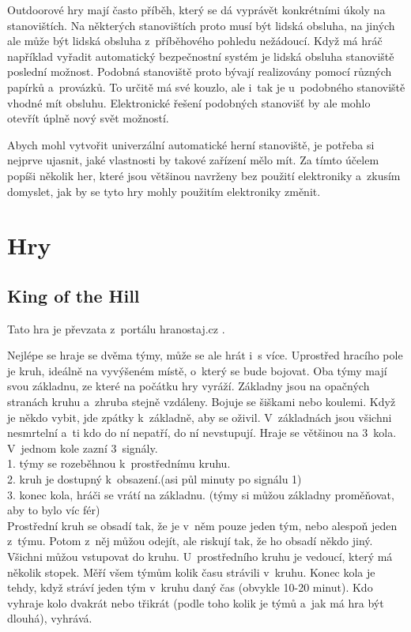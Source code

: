 Outdoorové hry mají často příběh, který se dá vyprávět konkrétními úkoly na stanovištích.
Na některých stanovištích proto musí být lidská obsluha, na jiných ale může být lidská obsluha z~příběhového pohledu nežádoucí.
Když má hráč například vyřadit automatický bezpečnostní systém je lidská obsluha stanoviště poslední možnost.
Podobná stanoviště proto bývají realizovány pomocí různých papírků a~provázků.
To určitě má své kouzlo, ale i~tak je u~podobného stanoviště vhodné mít obsluhu.
Elektronické řešení podobných stanovišť by ale mohlo otevřít úplně nový svět možností.

Abych mohl vytvořit univerzální automatické herní stanoviště, je potřeba si nejprve ujasnit, jaké vlastnosti by takové zařízení mělo mít.
Za tímto účelem popíši několik her, které jsou většinou navrženy bez použití elektroniky a~zkusím domyslet, jak by se tyto hry mohly použitím elektroniky změnit.

\section{Hry}
\subsection{King of the Hill \label{KOTH} }
Tato hra je převzata z~portálu hranostaj.cz \cite{KingOfTheHill}.

Nejlépe se hraje se dvěma týmy, může se ale hrát i~s více. 
Uprostřed hracího pole je kruh, ideálně na vyvýšeném místě, o~který se bude bojovat. 
Oba týmy mají svou základnu, ze které na počátku hry vyráží.
Základny jsou na opačných stranách kruhu a~zhruba stejně vzdáleny.
Bojuje se šiškami nebo koulemi. 
Když je někdo vybit, jde zpátky k~základně, aby se oživil. 
V~základnách jsou všichni nesmrtelní a~ti kdo do ní nepatří, do ní nevstupují.
Hraje se většinou na 3~kola. 
V~jednom kole zazní 3~signály.\\
1. týmy se rozeběhnou k~prostřednímu kruhu.\\
2. kruh je dostupný k~obsazení.(asi půl minuty po signálu 1)\\
3. konec kola, hráči se vrátí na základnu. (týmy si můžou základny proměňovat, aby to bylo víc fér)\\
Prostřední kruh se obsadí tak, že je v~něm pouze jeden tým, nebo alespoň jeden z~týmu. 
Potom z~něj můžou odejít, ale riskují tak, že ho obsadí někdo jiný. 
Všichni můžou vstupovat do kruhu.
U~prostředního kruhu je vedoucí, který má několik stopek. 
Měří všem týmům kolik času strávili v~kruhu. 
Konec kola je tehdy, když stráví jeden tým v~kruhu daný čas (obvykle 10-20 minut). 
Kdo vyhraje kolo dvakrát nebo třikrát (podle toho kolik je týmů a~jak má hra být dlouhá), vyhrává.

